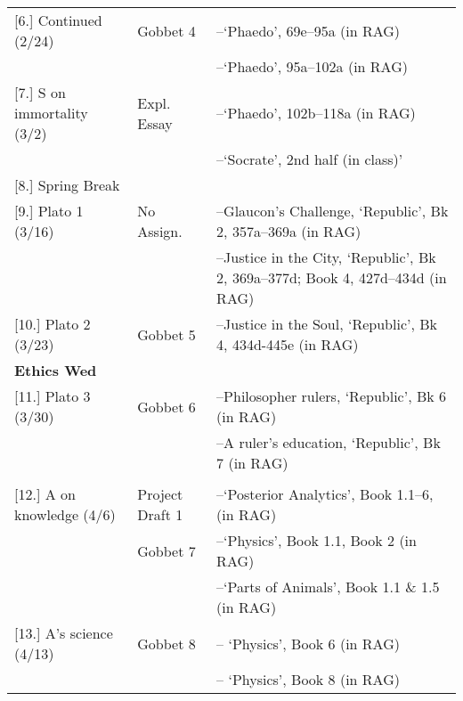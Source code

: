 \documentclass[article,oneside]{memoir}
\begin{document}
\begin{center}
\begin{longtable}{p{4.5cm}p{2cm}p{6.5cm}}
[6.] Continued (2/24) 			& 	Gobbet 4          & --`Phaedo', 69e--95a  (in RAG)   \\
						        & 				 & --`Phaedo', 95a--102a  (in RAG) \\ [1.8\baselineskip]
  
[7.] S on immortality (3/2)	  	& Expl. Essay		 & --`Phaedo', 102b--118a  (in RAG)   \\
								& 				 & --`Socrate', 2nd half (in class)' \\ [1.8\baselineskip] 

[8.] Spring Break		& 				 &  					\\ [1.8\baselineskip]	


[9.] Plato 1 (3/16)				& No Assign.			& --Glaucon's Challenge, `Republic', Bk 2, 357a--369a (in RAG)  \\ 
							& 	        				& --Justice in the City, `Republic', Bk 2, 369a--377d; Book 4, 427d--434d (in RAG) \\ [1.8\baselineskip]
				     			 


[10.] Plato 2	(3/23)			& Gobbet 5			&   --Justice in the Soul, `Republic', Bk 4, 434d-445e (in RAG) \\
	\textbf{Ethics Wed}	            	&					&   \\  [1.8\baselineskip]

[11.] Plato 3	(3/30)			& Gobbet 6			& --Philosopher rulers, `Republic', Bk 6 (in RAG)  \\
		            				&		   			& --A ruler's education, `Republic', Bk 7 (in RAG)  \\    \\ [1.8\baselineskip]
                                  			      

[12.] A on knowledge (4/6)			& Project Draft 1		& --`Posterior Analytics', Book 1.1--6, (in RAG) \\
						    	&  Gobbet 7					& --`Physics', Book 1.1, Book 2 (in RAG) \\
							&					& --`Parts of Animals', Book 1.1 \& 1.5 (in RAG)	 \\ [1.8\baselineskip]
                                    

[13.] A's science  (4/13)	& Gobbet 8			& -- `Physics', Book 6 (in RAG) \\ 
			    				& 			& -- `Physics', Book 8 (in RAG) \\ [1.8\baselineskip]


\end{longtable}
\end{center}
\end{document}
